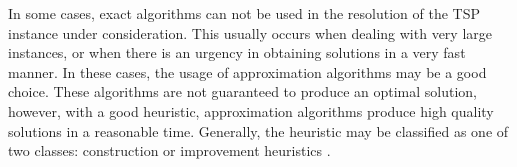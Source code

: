 In some cases, exact algorithms can not be used in the resolution of the TSP instance under consideration. This usually occurs when dealing with very large instances, or when there is an urgency in obtaining solutions in a very fast manner. In these cases, the usage of approximation algorithms may be a good choice. These algorithms are not guaranteed to produce an optimal solution,
however, with a good heuristic, approximation algorithms produce high quality solutions in a reasonable time. Generally, the heuristic may be classified as one of two classes: construction or improvement heuristics \cite{heuristics_tsp}.